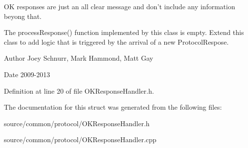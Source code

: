 O\-K responses are just an all clear message and don't include any information beyong that.

The process\-Response() function implemented by this class is empty. Extend this class to add logic that is triggered by the arrival of a new Protocol\-Respose. \begin{DoxyAuthor}{Author}
Joey Schnurr, Mark Hammond, Matt Gay 
\end{DoxyAuthor}
\begin{DoxyDate}{Date}
2009-\/2013 
\end{DoxyDate}


Definition at line 20 of file O\-K\-Response\-Handler.\-h.



The documentation for this struct was generated from the following files\-:\begin{DoxyCompactItemize}
\item 
source/common/protocol/O\-K\-Response\-Handler.\-h\item 
source/common/protocol/O\-K\-Response\-Handler.\-cpp\end{DoxyCompactItemize}
